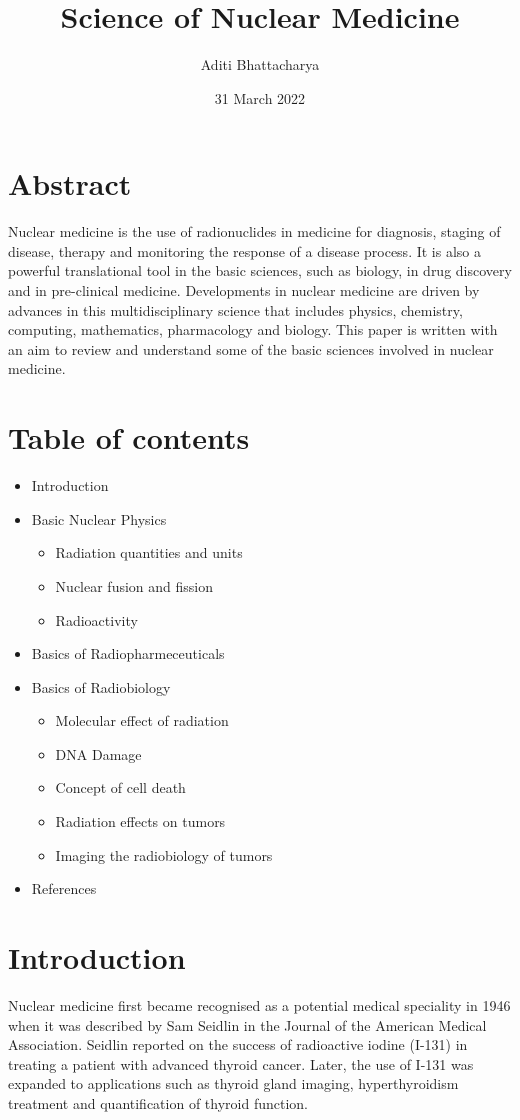 \documentclass{article}
\title{\textbf{Science of Nuclear Medicine}}
\author{Aditi Bhattacharya}
\date{31 March 2022}
\begin{document}
\maketitle
\section*{Abstract}
Nuclear medicine is the use of radionuclides in medicine for diagnosis, staging of disease, therapy and monitoring the response of a disease process. It is also a powerful translational tool in the basic sciences, such as biology, in drug discovery and in pre-clinical medicine. Developments in nuclear medicine are driven by advances in this multidisciplinary science that includes physics, chemistry, computing, mathematics, pharmacology and biology. This paper is written with an aim to review and understand some of the basic sciences involved in nuclear medicine. 

\section*{Table of contents}
\begin{itemize}
    \item Introduction
    \item Basic Nuclear Physics
    \begin{itemize}
        \item Radiation quantities and units
        \item Nuclear fusion and fission
        \item Radioactivity
    \end{itemize}
    \item Basics of Radiopharmeceuticals
    \item Basics of Radiobiology
    \begin{itemize}
        \item Molecular effect of radiation
        \item DNA Damage
        \item Concept of cell death
        \item Radiation effects on tumors
        \item Imaging the radiobiology of tumors
    \end{itemize}
    \item References
\end{itemize}


\section*{Introduction}
Nuclear medicine first became recognised as a potential medical speciality in 1946 when it was described by Sam Seidlin in the Journal of the American Medical Association. Seidlin reported on the success of radioactive iodine (I-131) in treating a patient with advanced thyroid cancer. Later, the use of I-131 was expanded to applications such as thyroid gland imaging, hyperthyroidism treatment and quantification of thyroid function.
\end{document}
